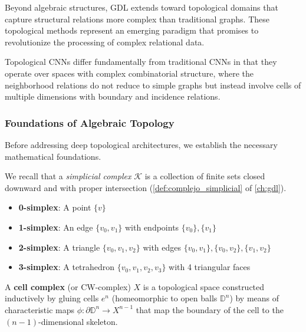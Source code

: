 Beyond algebraic structures, \gls{GDL} extends toward topological domains that capture structural relations more complex than traditional graphs. These topological methods represent an emerging paradigm that promises to revolutionize the processing of complex relational data.

Topological CNNs differ fundamentally from traditional CNNs in that they operate over spaces with complex combinatorial structure, where the neighborhood relations do not reduce to simple graphs but instead involve cells of multiple dimensions with boundary and incidence relations.

\subsubsection{Foundations of Algebraic Topology}

Before addressing deep topological architectures, we establish the necessary mathematical foundations.

We recall that a \textit{simplicial complex} $\mathcal{K}$ is a collection of finite sets closed downward and with proper intersection (\autoref{def:complejo_simplicial} of \autoref{ch:gdl}).\label{def:complejo_simplicial_cnn}

\begin{example}\label{ex:simplicios_bajos}
\leavevmode
\begin{itemize}
    \item \textbf{0-simplex}: A point $\{v\}$
    \item \textbf{1-simplex}: An edge $\{v_0, v_1\}$ with endpoints $\{v_0\}, \{v_1\}$
    \item \textbf{2-simplex}: A triangle $\{v_0, v_1, v_2\}$ with edges $\{v_0,v_1\}, \{v_0,v_2\}, \{v_1,v_2\}$
    \item \textbf{3-simplex}: A tetrahedron $\{v_0, v_1, v_2, v_3\}$ with 4 triangular faces
\end{itemize}
\end{example}

\begin{definition}\label{def:complejo_celular}
A \textbf{cell complex} (or CW-complex) $X$ is a topological space constructed inductively by gluing cells $e^n$ (homeomorphic to open balls $\mathbb{D}^n$) by means of characteristic maps $\phi: \partial \mathbb{D}^n \to X^{n-1}$ that map the boundary of the cell to the $(n-1)$-dimensional skeleton.
\end{definition}

